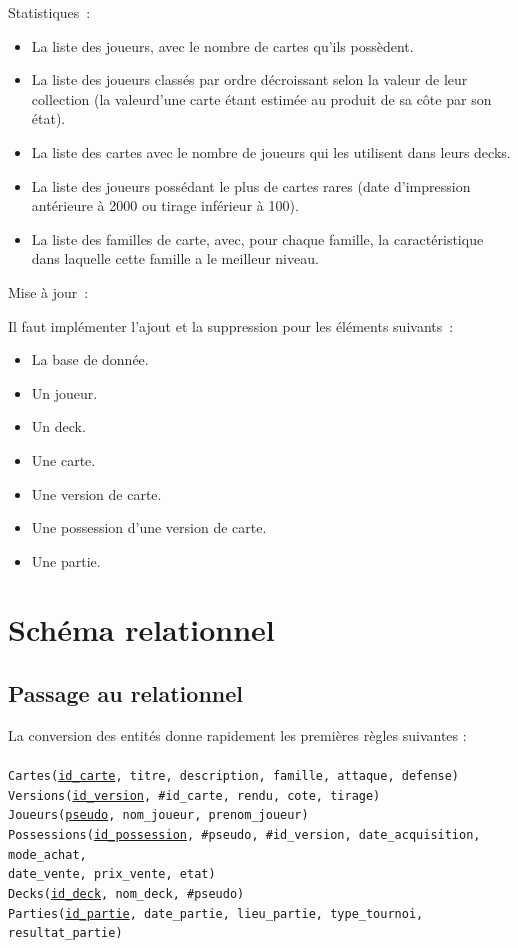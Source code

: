 \documentclass[a4paper,10.5pt]{article}
\begin{document}
Statistiques~:

\begin{itemize}
  \item La liste des joueurs, avec le nombre de cartes qu’ils possèdent.
  \item La liste des joueurs classés par ordre décroissant selon la valeur de
    leur collection (la valeurd’une carte étant estimée au produit de sa côte
    par son état).
  \item La liste des cartes avec le nombre de joueurs qui les utilisent dans
    leurs decks.
  \item La liste des joueurs possédant le plus de cartes rares (date
    d’impression antérieure à 2000 ou tirage inférieur à 100).
  \item La liste des familles de carte, avec, pour chaque famille, la
    caractéristique dans laquelle cette famille a le meilleur niveau.
\end{itemize}

Mise à jour~:

Il faut implémenter l'ajout et la suppression pour les éléments suivants~:
\begin{itemize}
  \item La base de donnée.
  \item Un joueur.
  \item Un deck.
  \item Une carte.
  \item Une version de carte.
  \item Une possession d'une version de carte.
  \item Une partie.
\end{itemize}

\section{Schéma relationnel}
\subsection{Passage au relationnel}

La conversion des entités donne rapidement les premières règles suivantes :\\
\\
\texttt{Cartes(\underline{id\_carte}, titre, description, famille, attaque, defense)} \\
\texttt{Versions(\underline{id\_version}, \#id\_carte, rendu, cote, tirage)} \\
\texttt{Joueurs(\underline{pseudo}, nom\_joueur, prenom\_joueur)} \\
\texttt{Possessions(\underline{id\_possession}, \#pseudo, \#id\_version, date\_acquisition, mode\_achat,\\ date\_vente, prix\_vente, etat)} \\
\texttt{Decks(\underline{id\_deck}, nom\_deck, \#pseudo)} \\
\texttt{Parties(\underline{id\_partie}, date\_partie, lieu\_partie, type\_tournoi, resultat\_partie)} \\
\end{document}
